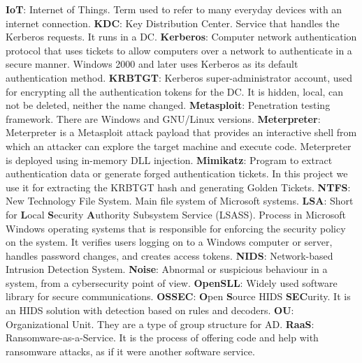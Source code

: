 \linej
\linej
\textbf{IoT}: Internet of Things. Term used to refer to many everyday devices with an internet connection.
\linej
\linej
\textbf{KDC}: Key Distribution Center. Service that handles the Kerberos requests. It runs in a DC.
\linej
\linej
\textbf{Kerberos}: Computer network authentication protocol that uses tickets to allow computers over a network to authenticate in a secure manner. Windows 2000 and later uses Kerberos as its default authentication method.
\linej
\linej
\textbf{KRBTGT}: Kerberos super-administrator account, used for encrypting all the authentication tokens for the DC. It is hidden, local, can not be deleted, neither the name changed.
\linej
\linej
\textbf{Metasploit}: Penetration testing framework. There are Windows and GNU/Linux versions.
\linej
\linej
\textbf{Meterpreter}: Meterpreter is a Metasploit attack payload that provides an interactive shell from which an attacker can explore the target machine and execute code. Meterpreter is deployed using in-memory DLL injection.
\linej
\linej
\textbf{Mimikatz}: Program to extract authentication data or generate forged authentication tickets. In this project we use it for extracting the KRBTGT hash and generating Golden Tickets.
\linej
\linej
\textbf{NTFS}: New Technology File System. Main file system of Microsoft systems.
\linej
\linej
\textbf{LSA}: Short for \textbf{L}ocal \textbf{S}ecurity \textbf{A}uthority Subsystem Service (LSASS). Process in Microsoft Windows operating systems that is responsible for enforcing the security policy on the system. It verifies users logging on to a Windows computer or server, handles password changes, and creates access tokens.
\linej
\linej
\textbf{NIDS}: Network-based Intrusion Detection System.
\linej
\linej
\textbf{Noise}: Abnormal or suspicious behaviour in a system, from a cybersecurity point of view.
\linej
\linej
\textbf{OpenSLL}: Widely used software library for secure communications.
\linej
\linej
\textbf{OSSEC}: \textbf{O}pen \textbf{S}ource HIDS \textbf{SEC}urity. It is an HIDS solution with detection based on rules and decoders.
\linej
\linej
\textbf{OU}: Organizational Unit. They are a type of group structure for AD.
\linej
\linej
\textbf{RaaS}: Ransomware-as-a-Service. It is the process of offering code and help with ransomware attacks, as if it were another software service.
